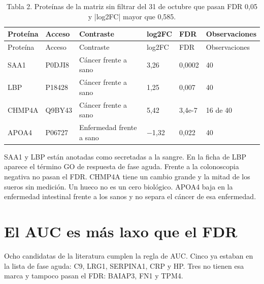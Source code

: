 \documentclass[12pt,oneside]{report}
\begin{document}
\begin{longtable}{p{2.58cm} p{2.58cm} p{2.58cm} p{2.58cm} p{2.58cm} p{2.58cm}}
\caption{Tabla 2. Proteínas de la matriz sin filtrar del 31 de octubre que pasan FDR 0,05 y |log2FC| mayor que 0,585.}\\
\toprule
Proteína & Acceso & Contraste & log2FC & FDR & Observaciones\\
\midrule
\endfirsthead
\toprule
Proteína & Acceso & Contraste & log2FC & FDR & Observaciones\\
\midrule
\endhead
SAA1 & P0DJI8 & Cáncer frente a sano & 3,26 & 0,0002 & 40\\
LBP & P18428 & Cáncer frente a sano & 1,25 & 0,007 & 40\\
CHMP4A & Q9BY43 & Cáncer frente a sano & 5,42 & 3,4e-7 & 16 de 40\\
APOA4 & P06727 & Enfermedad frente a sano & −1,32 & 0,022 & 40\\
\bottomrule
\end{longtable}
SAA1 y LBP están anotadas como secretadas a la sangre. En la ficha de LBP aparece el término GO de respuesta de fase aguda. Frente a la colonoscopia negativa no pasan el FDR. CHMP4A tiene un cambio grande y la mitad de los sueros sin medición. Un hueco no es un cero biológico. APOA4 baja en la enfermedad intestinal frente a los sanos y no separa el cáncer de esa enfermedad.

\section{El AUC es más laxo que el FDR}
Ocho candidatas de la literatura cumplen la regla de AUC. Cinco ya estaban en la lista de fase aguda: C9, LRG1, SERPINA1, CRP y HP. Tres no tienen esa marca y tampoco pasan el FDR: BAIAP3, FN1 y TPM4.
\end{document}
